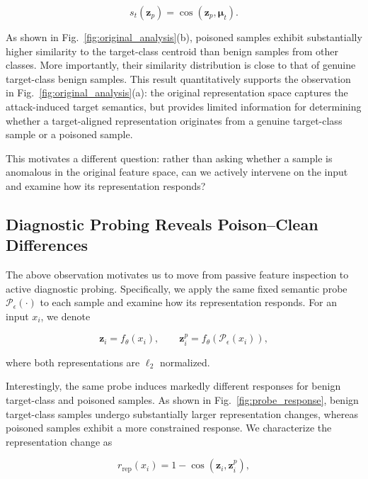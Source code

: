 \documentclass[10pt,journal]{IEEEtran}
\begin{document}
\begin{equation}
    s_t(\mathbf{z}_p)
    =
    \operatorname{cos}
    \left(
        \mathbf{z}_p,
        \boldsymbol{\mu}_t
    \right).
    \label{eq:target_similarity}
\end{equation}

As shown in Fig.~\ref{fig:original_analysis}(b), poisoned samples
exhibit substantially higher similarity to the target-class centroid
than benign samples from other classes. More importantly, their
similarity distribution is close to that of genuine target-class
benign samples. This result quantitatively supports the observation
in Fig.~\ref{fig:original_analysis}(a): the original representation
space captures the attack-induced target semantics, but provides
limited information for determining whether a target-aligned
representation originates from a genuine target-class sample or a
poisoned sample.

This motivates a different question: rather than asking whether a
sample is anomalous in the original feature space, can we actively
intervene on the input and examine how its representation responds?


\subsection{Diagnostic Probing Reveals Poison--Clean Differences}
\label{sec:probe_observation}

The above observation motivates us to move from passive feature
inspection to active diagnostic probing. Specifically, we apply the
same fixed semantic probe $\mathcal{P}_{\epsilon}(\cdot)$ to each sample and examine
how its representation responds. For an input $x_i$, we denote

\begin{equation}
    \mathbf{z}_i=f_{\theta}(x_i), \qquad
    \mathbf{z}_i^{p}=f_{\theta}(\mathcal{P}_{\epsilon}(x_i)),
    \label{eq:probe_representation}
\end{equation}

where both representations are $\ell_2$ normalized.

Interestingly, the same probe induces markedly different responses
for benign target-class and poisoned samples. As shown in
Fig.~\ref{fig:probe_response}, benign target-class samples undergo
substantially larger representation changes, whereas poisoned
samples exhibit a more constrained response. We characterize the
representation change as

\begin{equation}
    r_{\mathrm{rep}}(x_i)
    =
    1-\operatorname{cos}
    (\mathbf{z}_i,\mathbf{z}_i^{p}),
    \label{eq:response_magnitude}
\end{equation}
\end{document}
